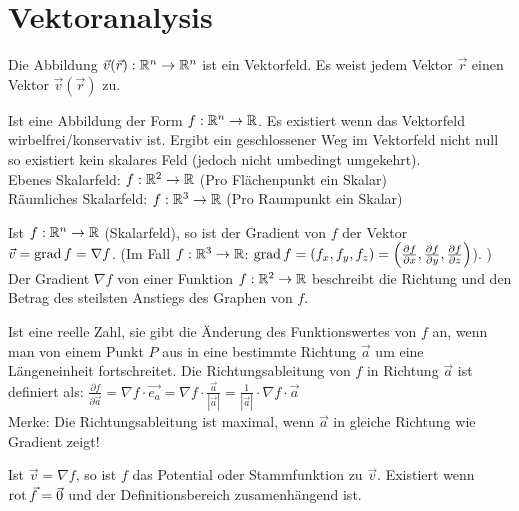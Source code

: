 \section{Vektoranalysis}
\begin{definition}[Vektorfeld]
Die Abbildung $\vec{v}(\vec{r}): \mathbb{R}^n \to \mathbb{R}^n$ ist ein Vektorfeld. Es weist jedem
Vektor $\vec{r}$ einen Vektor $\vec{v}(\vec{r})$ zu.
\end{definition}

\begin{definition}[Skalarfeld]
Ist eine Abbildung der Form $f: \mathbb{R}^n \to \mathbb{R}$. Es existiert wenn das Vektorfeld wirbelfrei/konservativ ist. Ergibt ein geschlossener Weg im Vektorfeld nicht null so existiert kein skalares Feld (jedoch nicht umbedingt umgekehrt).\\
Ebenes Skalarfeld: $f: \mathbb{R}^2 \to \mathbb{R}$ (Pro Flächenpunkt ein Skalar)\\
Räumliches Skalarfeld: $f: \mathbb{R}^3 \to \mathbb{R}$ (Pro Raumpunkt ein Skalar)
\end{definition}

\begin{definition}[Gradient]
Ist $f: \mathbb{R}^n \to \mathbb{R}$ (Skalarfeld), so ist der Gradient von $f$ der Vektor
$\vec{v} = \operatorname{grad} f = \nabla f$. (Im Fall $f: \mathbb{R}^3 \to \mathbb{R}$:   $\operatorname{grad} f = (f_x, f_y, f_z) =
\left( \frac{\partial f}{\partial x}, \frac{\partial f}{\partial y}, \frac{\partial f}{\partial z} \right)$). ) 
Der Gradient $\nabla f$ von einer Funktion $f : \mathbb{R}^2 \to \mathbb{R}$ beschreibt die Richtung 
und den Betrag des steilsten Anstiegs des Graphen von $f$.
\end{definition}

\begin{definition}[Richtungsableitung]
Ist eine reelle Zahl, sie gibt die Änderung des Funktionswertes von $f$ an, wenn man von einem Punkt $P$ aus in eine bestimmte Richtung $\vec{a}$ um eine Längeneinheit fortschreitet. Die Richtungsableitung von $f$ in Richtung $\vec{a}$ ist definiert als: 
$\frac{\partial f}{\partial \vec{a}} = \nabla f \cdot \vec{e_a} = \nabla f \cdot \frac{\vec{a}}{|\vec{a}|} = \frac{1}{|\vec{a}|} \cdot \nabla f \cdot \vec{a}$\\
Merke: Die Richtungsableitung ist maximal, wenn $\vec{a}$ in gleiche Richtung wie Gradient zeigt!
\end{definition}

\begin{definition}[Potential]
Ist $\vec{v} = \nabla f$, so ist $f$ das Potential oder Stammfunktion zu $\vec{v}$.
Existiert wenn $\operatorname{rot} \vec{f} = \vec{0}$ und der Definitionsbereich zusamenhängend ist.
\end{definition}

